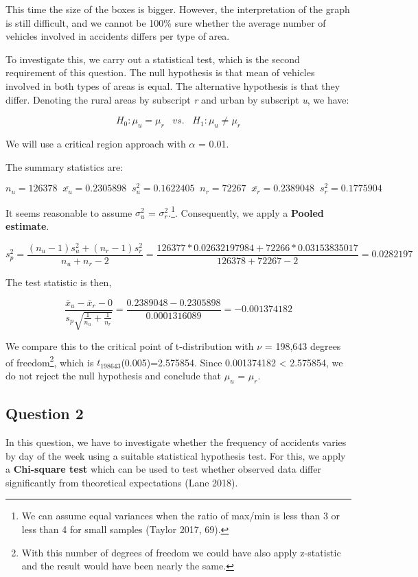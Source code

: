 \documentclass[]{article}
\let\rmarkdownfootnote\footnote%
\def\footnote{\protect\rmarkdownfootnote}
\begin{document}
This time the size of the boxes is bigger. However, the interpretation
of the graph is still difficult, and we cannot be 100\% sure whether the
average number of vehicles involved in accidents differs per type of
area.

To investigate this, we carry out a statistical test, which is the
second requirement of this question. The null hypothesis is that mean of
vehicles involved in both types of areas is equal. The alternative
hypothesis is that they differ. Denoting the rural areas by subscript
\emph{r} and urban by subscript \emph{u}, we have:

\[H_{0}: \mu_{u} = \mu_{r}\;\;\;vs.\;\;\;H_{1}: \mu_{u} \neq \mu_{r}\]

We will use a critical region approach with \(\alpha\) = 0.01.

The summary statistics are:

\[n_{u}=126378\;\;\bar{x_{u}}=0.2305898\;\;s_{u}^{2}=0.1622405\;\;n_{r}=72267\;\;\bar{x_{r}}=0.2389048\;\;s_{r}^{2}=0.1775904\]

It seems reasonable to assume \(\sigma_{u}^{2}\) =
\(\sigma_{r}^{2}\).\footnote{We can assume equal variances when the
  ratio of max/min is less than 3 or less than 4 for small samples
  (Taylor 2017, 69).}. Consequently, we apply a \textbf{Pooled
estimate}.

\[s_{p}^{2}=\frac{(n_{u}-1)s_{u}^{2}+(n_{r}-1)s_{r}^{2}}{n_{u}+n_{r}-2} = \frac{126377*0.02632197984+72266*0.03153835017}{126378+72267-2}=0.0282197\]

The test statistic is then,

\[\frac{\bar x_{u}-\bar x_{r}-0}{s_{p}\sqrt{\frac{1}{n_{u}}+\frac{1}{n_{r}}}}=\frac{0.2389048-0.2305898}{0.0001316089}=-0.001374182\]

We compare this to the critical point of t-distribution with \(\nu\) =
198,643 degrees of freedom\footnote{With this number of degrees of
  freedom we could have also apply z-statistic and the result would have
  been nearly the same.}, which is \(t_{198643}\)(0.005)=2.575854. Since
\textbar{}0.001374182\textbar{} \textless{} 2.575854, we do not reject
the null hypothesis and conclude that \(\mu_{u}\) = \(\mu_{r}\).

\subsection{Question 2}\label{question-2}

In this question, we have to investigate whether the frequency of
accidents varies by day of the week using a suitable statistical
hypothesis test. For this, we apply a \textbf{Chi-square test} which can
be used to test whether observed data differ significantly from
theoretical expectations (Lane 2018).
\end{document}
